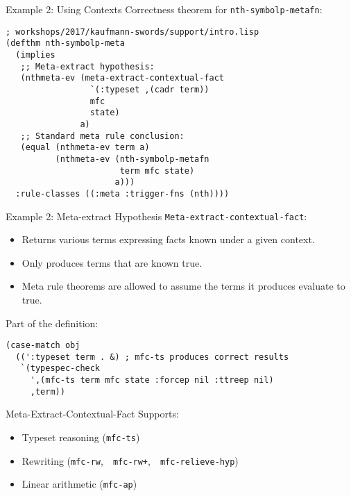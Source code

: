 \begin{frame}[fragile]{Example 2: Using Contexts}
Correctness theorem for \texttt{nth-symbolp-metafn}:

\begin{Verbatim}[formatcom=\small]
; workshops/2017/kaufmann-swords/support/intro.lisp
(defthm nth-symbolp-meta
  (implies
   ;; Meta-extract hypothesis:
   (nthmeta-ev (meta-extract-contextual-fact
                 `(:typeset ,(cadr term))
                 mfc 
                 state)
               a)
   ;; Standard meta rule conclusion:
   (equal (nthmeta-ev term a)
          (nthmeta-ev (nth-symbolp-metafn
                       term mfc state)
                      a)))
  :rule-classes ((:meta :trigger-fns (nth))))
\end{Verbatim}

\end{frame}
\begin{frame}[fragile]{Example 2: Meta-extract Hypothesis}
  \texttt{Meta-extract-contextual-fact}:
\begin{itemize}
\item Returns various terms expressing facts known under a given context.
\item Only produces terms that are known true.
\item Meta rule theorems are allowed to assume the terms it produces
  evaluate to true.
\end{itemize}
Part of the definition:
\begin{Verbatim}[formatcom=\small]
(case-match obj
  ((':typeset term . &) ; mfc-ts produces correct results
   `(typespec-check
     ',(mfc-ts term mfc state :forcep nil :ttreep nil)
     ,term))
\end{Verbatim}
\end{frame}
\begin{frame}[fragile]{Meta-Extract-Contextual-Fact}
Supports:
\begin{itemize}
\item Typeset reasoning (\texttt{mfc-ts})
\item Rewriting (\texttt{mfc-rw},\ \ \texttt{mfc-rw+},\ \ \texttt{mfc-relieve-hyp})
\item Linear arithmetic (\texttt{mfc-ap})
\end{itemize}
\end{frame}

